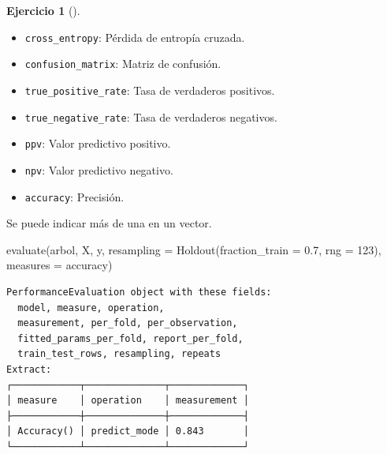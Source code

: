 \documentclass[
  a4paper,
]{scrreport}
\newenvironment{Shaded}{\begin{snugshade}}{\end{snugshade}}
\newcommand{\FloatTok}[1]{\textcolor[rgb]{0.68,0.00,0.00}{#1}}
\newcommand{\FunctionTok}[1]{\textcolor[rgb]{0.28,0.35,0.67}{#1}}
\newcommand{\NormalTok}[1]{\textcolor[rgb]{0.00,0.23,0.31}{#1}}
\newcommand{\OperatorTok}[1]{\textcolor[rgb]{0.37,0.37,0.37}{#1}}
\providecommand{\tightlist}{%
  \setlength{\itemsep}{0pt}\setlength{\parskip}{0pt}}\usepackage{longtable,booktabs,array}
\theoremstyle{definition}
\newtheorem{exercise}{Ejercicio}[chapter]
\theoremstyle{remark}
\begin{document}
\begin{exercise}[]
\begin{enumerate}
\begin{tcolorbox}
\begin{itemize}
    \begin{itemize}
    \tightlist
    \item
      \texttt{cross\_entropy}: Pérdida de entropía cruzada.
    \item
      \texttt{confusion\_matrix}: Matriz de confusión.
    \item
      \texttt{true\_positive\_rate}: Tasa de verdaderos positivos.
    \item
      \texttt{true\_negative\_rate}: Tasa de verdaderos negativos.
    \item
      \texttt{ppv}: Valor predictivo positivo.
    \item
      \texttt{npv}: Valor predictivo negativo.
    \item
      \texttt{accuracy}: Precisión.
    \end{itemize}

    Se puede indicar más de una en un vector.
  \end{itemize}

  \end{tcolorbox}

  \begin{tcolorbox}[enhanced jigsaw, left=2mm, colback=white, coltitle=black, opacitybacktitle=0.6, titlerule=0mm, breakable, bottomrule=.15mm, toptitle=1mm, bottomtitle=1mm, colbacktitle=quarto-callout-tip-color!10!white, opacityback=0, rightrule=.15mm, title=\textcolor{quarto-callout-tip-color}{\faLightbulb}\hspace{0.5em}{Solución}, colframe=quarto-callout-tip-color-frame, arc=.35mm, leftrule=.75mm, toprule=.15mm]

\begin{Shaded}
\begin{Highlighting}[]
\FunctionTok{evaluate}\NormalTok{(arbol, X, y, resampling }\OperatorTok{=} \FunctionTok{Holdout}\NormalTok{(fraction\_train }\OperatorTok{=} \FloatTok{0.7}\NormalTok{, rng }\OperatorTok{=} \FloatTok{123}\NormalTok{), measures }\OperatorTok{=}\NormalTok{ accuracy)}
\end{Highlighting}
\end{Shaded}

\begin{verbatim}
PerformanceEvaluation object with these fields:
  model, measure, operation,
  measurement, per_fold, per_observation,
  fitted_params_per_fold, report_per_fold,
  train_test_rows, resampling, repeats
Extract:
┌────────────┬──────────────┬─────────────┐
│ measure    │ operation    │ measurement │
├────────────┼──────────────┼─────────────┤
│ Accuracy() │ predict_mode │ 0.843       │
└────────────┴──────────────┴─────────────┘
\end{verbatim}


\end{tcolorbox}
\end{enumerate}
\end{exercise}
\end{document}
